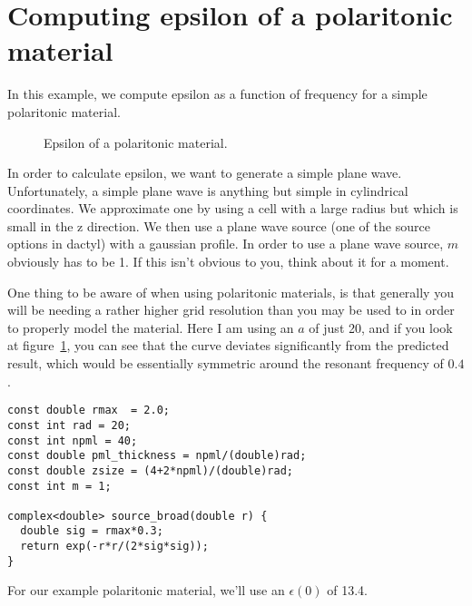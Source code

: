 \begin{comment}
#include <stdio.h>
#include <stdlib.h>
#include <signal.h>

#include "dactyl.h"
\end{comment}

\section{Computing epsilon of a polaritonic material}

In this example, we compute epsilon as a function of frequency for a simple
polaritonic material.

\begin{figure}
\label{epsilon_polariton}
\caption{Epsilon of a polaritonic material.}
\end{figure}

In order to calculate epsilon, we want to generate a simple plane wave.
Unfortunately, a simple plane wave is anything but simple in cylindrical
coordinates.  We approximate one by using a cell with a large radius but
which is small in the z direction.  We then use a plane wave source (one of
the source options in dactyl) with a gaussian profile.  In order to use a
plane wave source, $m$ obviously has to be 1.  If this isn't obvious to
you, think about it for a moment.

One thing to be aware of when using polaritonic materials, is that
generally you will be needing a rather higher grid resolution than you may
be used to in order to properly model the material.  Here I am using an $a$
of just 20, and if you look at figure~\ref{epsilon_polariton}, you can see
that the curve deviates significantly from the predicted result, which
would be essentially symmetric around the resonant frequency of $0.4$.

\begin{verbatim}
const double rmax  = 2.0;
const int rad = 20;
const int npml = 40;
const double pml_thickness = npml/(double)rad;
const double zsize = (4+2*npml)/(double)rad;
const int m = 1;

complex<double> source_broad(double r) {
  double sig = rmax*0.3;
  return exp(-r*r/(2*sig*sig));
}
\end{verbatim}

For our example polaritonic material, we'll use an $\epsilon(0)$ of 13.4.

